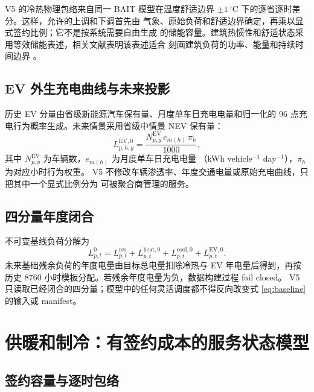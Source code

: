 \documentclass[UTF8,fontset=fandol,12pt]{ctexart}
\begin{document}
V5 的冷热物理包络来自同一 BAIT 模型在温度舒适边界
$\pm1\,^{\circ}\mathrm{C}$ 下的逐省逐时差分。这样，允许的上调和下调首先由
气象、原始负荷和舒适边界确定，再乘以显式签约比例；它不是按系统需要自由生成
的储能容量。建筑热惯性和舒适状态采用等效储能表述，相关文献表明该表述适合
刻画建筑负荷的功率、能量和持续时间边界
\cite{IEAEBC67,Stinner2016,Klein2017,HuangWu2019,Chen2023Cooling}。

\subsection{EV 外生充电曲线与未来投影}

历史 EV 分量由省级新能源汽车保有量、月度单车日充电电量和归一化的
96 点充电行为概率生成。未来情景采用省级中情景 NEV 保有量：
\begin{equation}
  L^{\mathrm{EV},0}_{p,h,y}
  =
  \frac{
    N^{\mathrm{EV}}_{p,y}\,
    e_{m(h)}\,
    \pi_h
  }{1000},
\end{equation}
其中 $N^{\mathrm{EV}}_{p,y}$ 为车辆数，$e_{m(h)}$ 为月度单车日充电电量
（kWh vehicle$^{-1}$ day$^{-1}$），$\pi_h$ 为对应小时行为权重。
V5 不修改车辆渗透率、年度交通电量或原始充电曲线，只把其中一个显式比例分为
可被聚合商管理的服务。

\subsection{四分量年度闭合}

不可变基线负荷分解为
\begin{equation}
  L^0_{p,t}
  =
  L^{\mathrm{res}}_{p,t}
  +L^{\mathrm{heat},0}_{p,t}
  +L^{\mathrm{cool},0}_{p,t}
  +L^{\mathrm{EV},0}_{p,t}.
  \label{eq:baseline}
\end{equation}
未来基础残余负荷的年度电量由目标总电量扣除冷热与 EV 年电量后得到，再按
历史 8760 小时模板分配。若残余年度电量为负，数据构建过程 fail closed。
V5 只读取已经闭合的四分量；模型中的任何灵活调度都不得反向改变式
\eqref{eq:baseline} 的输入或 manifest。

\section{供暖和制冷：有签约成本的服务状态模型}

\subsection{签约容量与逐时包络}
\end{document}
